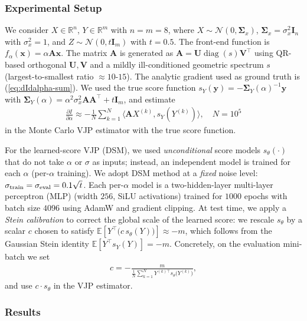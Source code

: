 \documentclass[conference]{IEEEtran}
\begin{document}
\subsubsection{Experimental Setup}
\label{subsec:exp_lin_gauss}

We consider $X\in\mathbb{R}^n$, $Y\in\mathbb{R}^m$ with $n=m=8$, where $X\sim\mathcal{N}(0,\bm \Sigma_x)$, 
$\bm \Sigma_x=\sigma_x^2 \bm I_n$ with $\sigma_x^2=1$, and $Z\sim\mathcal{N}(0,t \bm I_m)$ with $t=0.5$. 
The front-end function  is $f_\alpha(\bm x)=\alpha \bm A \bm x$. 
The matrix $\bm A$ is generated as $\bm A = \bm U\operatorname{diag}(s)\bm V^\top$ 
using QR-based orthogonal $\bm U,\bm V$ 
and a mildly ill-conditioned geometric spectrum $s$ 
(largest-to-smallest ratio $\approx 10$-$15$). 
The analytic gradient used as ground truth is (\ref{eq:dIdalpha-sum}).
We used the  true score function $s_Y(\bm y)=- \bm \Sigma_Y(\alpha)^{-1} \bm y$ 
with $\bm \Sigma_Y(\alpha)=\alpha^2\sigma_x^2 \bm A \bm A^\top+t \bm I_m$, and estimate
\begin{align}
\frac{\partial I}{\partial\alpha}\approx -
\frac{1}{N}\sum_{k=1}^{N}\langle \bm A X^{(k)}, s_Y(Y^{(k)})\rangle,\quad N=10^5
\end{align}
in the Monte Carlo VJP estimator with the true score function.

For the learned-score VJP (DSM), we used \emph{unconditional} score models $s_\theta(\cdot)$ 
that do not take $\alpha$ or $\sigma$ as inputs; 
instead, an independent model is trained for each $\alpha$ 
(per-$\alpha$ training). 
We adopt DSM method at a \emph{fixed} noise level: 
$\sigma_{\rm train}=\sigma_{\rm eval}=0.1\sqrt t$. 
Each per-$\alpha$ model is a two-hidden-layer multi-layer perceptron (MLP) 
(width $256$, SiLU activations) trained 
for $1000$ epochs with batch size $4096$ 
using AdamW and gradient clipping. 
At test time, we apply a {\em Stein calibration} 
to correct the global scale of the learned score: 
we rescale $s_\theta$ by a scalar $c$ chosen to satisfy 
$\mathbb{E}\!\left[Y^\top \big(c\,s_\theta(Y)\big)\right]\approx 
-m$, which follows from the Gaussian Stein identity 
$\mathbb{E}\!\left[Y^\top s_Y(Y)\right]=-m$. 
Concretely, on the evaluation mini-batch we set
\begin{align}   
c = -\frac{m}{\frac{1}{N}\sum_{k=1}^{N}
Y^{(k)\top}s_\theta\!\big(Y^{(k)}\big)},
\end{align}
and use $c\cdot s_\theta$ in the VJP estimator.


\subsubsection{Results}
\end{document}
